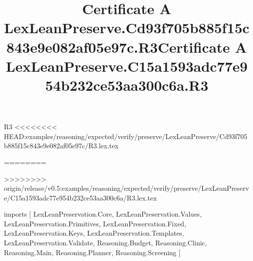 \begin{lexlean}{R3}
<<<<<<<< HEAD:examples/reasoning/expected/verify/preserve/LexLeanPreserve/Cd93f705b885f15c843e9e082af05e97c/R3.lex.tex
\title{Certificate A LexLeanPreserve.Cd93f705b885f15c843e9e082af05e97c.R3}
========
\title{Certificate A LexLeanPreserve.C15a1593adc77e954b232ce53aa300c6a.R3}
>>>>>>>> origin/release/v0.5:examples/reasoning/expected/verify/preserve/LexLeanPreserve/C15a1593adc77e954b232ce53aa300c6a/R3.lex.tex
\begin{coremodule}
imports [
  LexLeanPreservation.Core,
  LexLeanPreservation.Values,
  LexLeanPreservation.Primitives,
  LexLeanPreservation.Fixed,
  LexLeanPreservation.Keys,
  LexLeanPreservation.Templates,
  LexLeanPreservation.Validate,
  Reasoning.Budget,
  Reasoning.Clinic,
  Reasoning.Main,
  Reasoning.Planner,
  Reasoning.Screening
]


\end{coremodule}
\end{lexlean}
